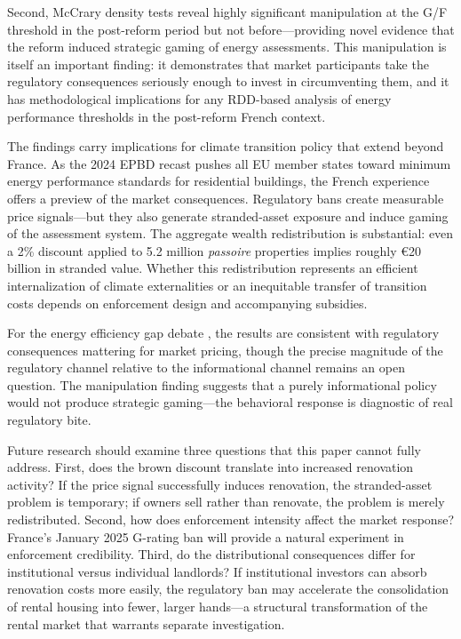 \documentclass[12pt]{article}
\begin{document}
Second, McCrary density tests reveal highly significant manipulation at the G/F threshold in the post-reform period but not before---providing novel evidence that the reform induced strategic gaming of energy assessments. This manipulation is itself an important finding: it demonstrates that market participants take the regulatory consequences seriously enough to invest in circumventing them, and it has methodological implications for any RDD-based analysis of energy performance thresholds in the post-reform French context.

The findings carry implications for climate transition policy that extend beyond France. As the 2024 EPBD recast pushes all EU member states toward minimum energy performance standards for residential buildings, the French experience offers a preview of the market consequences. Regulatory bans create measurable price signals---but they also generate stranded-asset exposure and induce gaming of the assessment system. The aggregate wealth redistribution is substantial: even a 2\% discount applied to 5.2 million \textit{passoire} properties implies roughly \euro{}20 billion in stranded value. Whether this redistribution represents an efficient internalization of climate externalities or an inequitable transfer of transition costs depends on enforcement design and accompanying subsidies.

For the energy efficiency gap debate \citep{gerarden2017assessing}, the results are consistent with regulatory consequences mattering for market pricing, though the precise magnitude of the regulatory channel relative to the informational channel remains an open question. The manipulation finding suggests that a purely informational policy would not produce strategic gaming---the behavioral response is diagnostic of real regulatory bite.

Future research should examine three questions that this paper cannot fully address. First, does the brown discount translate into increased renovation activity? If the price signal successfully induces renovation, the stranded-asset problem is temporary; if owners sell rather than renovate, the problem is merely redistributed. Second, how does enforcement intensity affect the market response? France's January 2025 G-rating ban will provide a natural experiment in enforcement credibility. Third, do the distributional consequences differ for institutional versus individual landlords? If institutional investors can absorb renovation costs more easily, the regulatory ban may accelerate the consolidation of rental housing into fewer, larger hands---a structural transformation of the rental market that warrants separate investigation.
\end{document}
